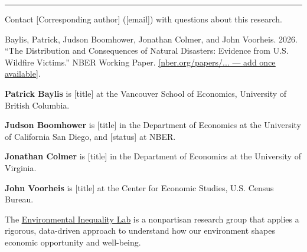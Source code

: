 \documentclass[
  11pt,
]{article}
\newenvironment{moreinfo}{%
  \par\vspace{12pt}%
  \noindent\textcolor{warmrule}{\rule{\linewidth}{0.7pt}}\par
  \vspace{7pt}%
  {\color{ink}\bfseries\fontsize{8.25pt}{10pt}\selectfont
   \textls[50]{\MakeUppercase{For more information}}\par}\vspace{4pt}%
  \color{cite}\fontsize{8.4pt}{11.5pt}\selectfont
  \setlength{\parskip}{5pt}%
}{\par}
\begin{document}
\vspace{6pt}

\begin{moreinfo}
Contact [Corresponding author] ([email]) with questions about this research.\par

Baylis, Patrick, Judson Boomhower, Jonathan Colmer, and John Voorheis. 2026. ``The Distribution and Consequences of Natural Disasters: Evidence from U.S. Wildfire Victims.'' NBER Working Paper. \href{[NBER working paper link — add once available]}{\color{cite}\underline{[nber.org/papers/... — add once available]}}.\par

\textbf{Patrick Baylis} is [title] at the Vancouver School of Economics, University of British Columbia.\par
\textbf{Judson Boomhower} is [title] in the Department of Economics at the University of California San Diego, and [status] at NBER.\par
\textbf{Jonathan Colmer} is [title] in the Department of Economics at the University of Virginia.\par
\textbf{John Voorheis} is [title] at the Center for Economic Studies, U.S. Census Bureau.\par

The \href{https://www.environmental-inequality-lab.org/}{\color{cite}\underline{Environmental Inequality Lab}} is a nonpartisan research group that applies a rigorous, data-driven approach to understand how our environment shapes economic opportunity and well-being.\par
\end{moreinfo}
\end{document}

